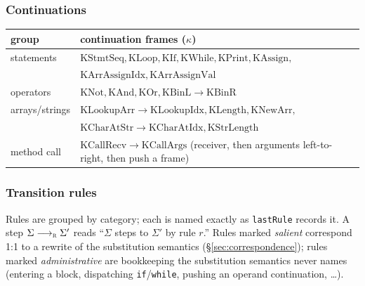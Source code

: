 \documentclass[11pt]{article}
\newcommand{\rulename}[1]{\textsc{#1}}
\newcommand{\Step}[1]{\longrightarrow_{\rulename{#1}}}
\begin{document}
\subsubsection{Continuations}

\begin{center}
\begin{tabular}{@{}ll@{}}
\toprule
group & continuation frames ($\kappa$) \\
\midrule
statements & $\mathrm{KStmtSeq}, \mathrm{KLoop}, \mathrm{KIf}, \mathrm{KWhile}, \mathrm{KPrint}, \mathrm{KAssign},$ \\
           & $\mathrm{KArrAssignIdx}, \mathrm{KArrAssignVal}$ \\
operators  & $\mathrm{KNot}, \mathrm{KAnd}, \mathrm{KOr}, \mathrm{KBinL}\!\to\!\mathrm{KBinR}$ \\
arrays/strings & $\mathrm{KLookupArr}\!\to\!\mathrm{KLookupIdx}, \mathrm{KLength}, \mathrm{KNewArr},$ \\
                & $\mathrm{KCharAtStr}\!\to\!\mathrm{KCharAtIdx}, \mathrm{KStrLength}$ \\
method call & $\mathrm{KCallRecv}\!\to\!\mathrm{KCallArgs}$ (receiver, then arguments left-to-right, then push a frame) \\
\bottomrule
\end{tabular}
\end{center}

\subsubsection{Transition rules}

Rules are grouped by category; each is named exactly as \texttt{lastRule}
records it. A step $\Sigma \Step{r} \Sigma'$ reads ``$\Sigma$ steps to
$\Sigma'$ by rule $r$.'' Rules marked \emph{salient} correspond 1:1 to a
rewrite of the substitution semantics (\S\ref{sec:correspondence}); rules
marked \emph{administrative} are bookkeeping the substitution semantics
never names (entering a block, dispatching \texttt{if}/\texttt{while},
pushing an operand continuation, \ldots).
\end{document}
